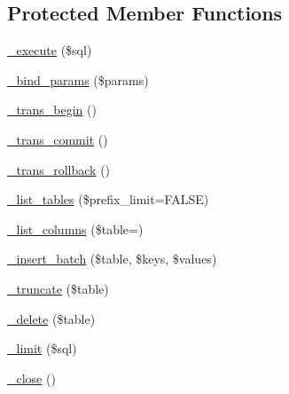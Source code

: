 \subsection*{Protected Member Functions}
\begin{DoxyCompactItemize}
\item 
\mbox{\hyperlink{class_c_i___d_b__oci8__driver_a114ab675d89bf8324a41785fb475e86d}{\+\_\+execute}} (\$sql)
\item 
\mbox{\hyperlink{class_c_i___d_b__oci8__driver_a66b8b06dadf7ff16c3877d5c024f5d2b}{\+\_\+bind\+\_\+params}} (\$params)
\item 
\mbox{\hyperlink{class_c_i___d_b__oci8__driver_ac81ac882c1d54347d810199a15856aac}{\+\_\+trans\+\_\+begin}} ()
\item 
\mbox{\hyperlink{class_c_i___d_b__oci8__driver_a6fe7f373e0b11cfae23a5f41c0b35dda}{\+\_\+trans\+\_\+commit}} ()
\item 
\mbox{\hyperlink{class_c_i___d_b__oci8__driver_ad49a116b0776c26b53114c9093fd102a}{\+\_\+trans\+\_\+rollback}} ()
\item 
\mbox{\hyperlink{class_c_i___d_b__oci8__driver_a435c0f3ce54fe7daa178baa8532ebd54}{\+\_\+list\+\_\+tables}} (\$prefix\+\_\+limit=F\+A\+L\+SE)
\item 
\mbox{\hyperlink{class_c_i___d_b__oci8__driver_a7ccb7f9c301fe7f0a9db701254142b63}{\+\_\+list\+\_\+columns}} (\$table=\textquotesingle{}\textquotesingle{})
\item 
\mbox{\hyperlink{class_c_i___d_b__oci8__driver_a1978e1358c812587a46e242630365099}{\+\_\+insert\+\_\+batch}} (\$table, \$keys, \$values)
\item 
\mbox{\hyperlink{class_c_i___d_b__oci8__driver_aa029600528fc1ce660a23ff4b4667f95}{\+\_\+truncate}} (\$table)
\item 
\mbox{\hyperlink{class_c_i___d_b__oci8__driver_a133ea8446ded52589bd22cc9163d0896}{\+\_\+delete}} (\$table)
\item 
\mbox{\hyperlink{class_c_i___d_b__oci8__driver_a3a02ea06541b8ecc25a33a61651562c8}{\+\_\+limit}} (\$sql)
\item 
\mbox{\hyperlink{class_c_i___d_b__oci8__driver_a4d9082658000e5ede8312067c6dda9db}{\+\_\+close}} ()
\end{DoxyCompactItemize}
